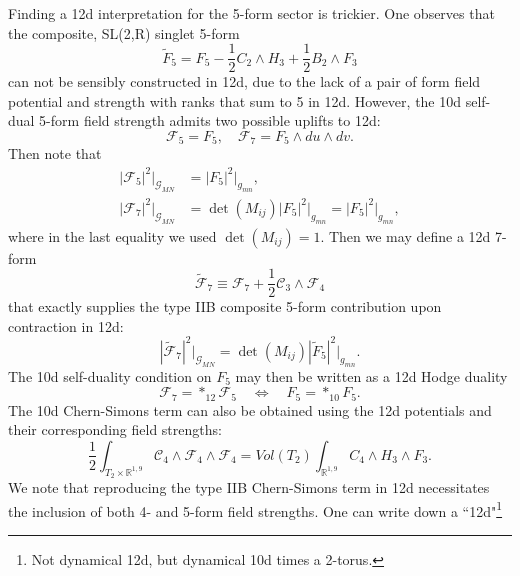 Finding a 12d interpretation for the 5-form sector is trickier. 
One observes that the composite, SL(2,R) singlet 5-form 
\begin{equation}
\tilde F_5 = F_5 - \frac12 C_2 \wedge H_3 + \frac{1}{2}B_2\wedge F_3    
\end{equation}
can not be sensibly constructed in 12d, due to the lack of a pair of form field potential and strength with ranks that sum to 5 in 12d.
However, the 10d self-dual 5-form field strength admits two possible uplifts to 12d:
\begin{equation}
\mathcal{F}_5 = F_5,\quad \mathcal{F}_7=F_5\wedge du\wedge dv.
\end{equation}
Then note that
\begin{equation}
\begin{aligned}
|\mathcal{F}_5|^2\bigg|_{\mathcal{G}_{MN}} 
&= |F_5|^2\bigg|_{g_{mn}},\\
|\mathcal{F}_7|^2\bigg|_{\mathcal{G}_{MN}}
&=\det(M_{ij})|F_5|^2\bigg|_{g_{mn}} = |F_5|^2\bigg|_{g_{mn}},
\end{aligned}
\end{equation}
where in the last equality we used $\det (M_{ij})=1$.
Then we may define a 12d 7-form
\begin{equation}
\tilde{\mathcal F}_7 \equiv \mathcal F_7 + \frac{1}{2}\mathcal{C}_3 \wedge \mathcal F_4
\end{equation}
that exactly supplies the type IIB composite 5-form contribution upon contraction in 12d:
\begin{equation}
|\tilde{\mathcal{F}}_7|^2\bigg|_{\mathcal{G}_{MN}} = 
\det(M_{ij})|\tilde F_5|^2\bigg|_{g_{mn}}.
\end{equation}
The 10d self-duality condition on $F_5$ may then be written as a 12d Hodge duality
\begin{equation}
\mathcal F_7 = *_{12}\mathcal F_5\quad
\Leftrightarrow\quad
F_5 = *_{10}F_5.
\label{12d interpretation of 10d self-duality}
\end{equation}
The 10d Chern-Simons term can also be obtained using the 12d potentials and their corresponding field strengths:
\begin{equation}
\frac{1}{2}\int_{T_2\times \mathbb{R}^{1,9}} \mathcal C_4\wedge \mathcal{F}_4\wedge\mathcal{F}_4=
Vol(T_2)\int_{\mathbb{R}^{1,9}}C_4\wedge H_3\wedge F_3.
\end{equation}
We note that reproducing the type IIB Chern-Simons term in 12d necessitates the inclusion of both 4- and 5-form field strengths.
One can write down a ``12d"\footnote{
Not dynamical 12d, but dynamical 10d times a 2-torus.
}

